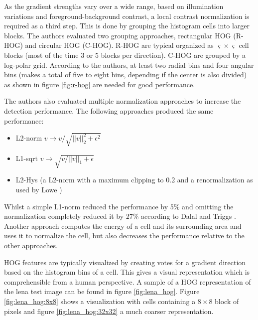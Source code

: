 As the gradient strengths vary over a wide range, based on illumination variations and foreground-background contrast, a local contrast normalization is required as a third step. This is done by grouping the histogram cells into larger blocks. The authors evaluated two grouping approaches, rectangular HOG (\acs{R-HOG}) and circular HOG (\acs{C-HOG}). \acs{R-HOG} are typical organized as $\varsigma \times \varsigma$ cell blocks (most of the time 3 or 5 blocks per direction). \acs{C-HOG} are grouped by a log-polar grid. According to the authors, at least two radial bins and four angular bins (makes a total of five to eight bins, depending if the center is also divided) as shown in figure \ref{fig:r-hog} are needed for good performance.



The authors also evaluated multiple normalization approaches to increase the detection performance.
The following approaches produced the same performance:
\begin{itemize}
	\item L2-norm $v \rightarrow v / \sqrt{||v||_2^2 + \epsilon^2}$
	\item L1-sqrt $v \rightarrow \sqrt{v / ||v||_1 + \epsilon}$
	\item L2-Hys (a L2-norm with a maximum clipping to 0.2 and a renormalization as used by Lowe \cite{Lowe2004})%
\end{itemize}
Whilst a simple L1-norm reduced the performance by 5\% and omitting the normalization completely reduced it by 27\% according to Dalal and Triggs \cite{Dalal2005}. Another approach computes the energy of a cell and its surrounding area and uses it to normalize the cell, but also decreases the performance relative to the other approaches.

\ac{HOG} features are typically visualized by creating votes for a gradient direction based on the histogram bins of a cell. This gives a visual representation which is comprehensible from a human perspective. A sample of a \ac{HOG} representation of the lena test image can be found in figure \ref{fig:lena_hog}. Figure \ref{fig:lena_hog:8x8} shows a visualization with cells containing a $8\times8$ block of pixels and figure \ref{fig:lena_hog:32x32} a much coarser representation.

